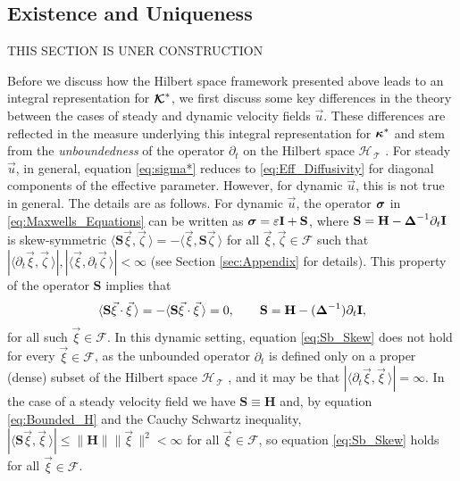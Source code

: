\documentclass[11pt]{amsart}
\newcommand{\Hb}{\mathbf{H}}
\newcommand{\Ib}{\mathbf{I}}
\newcommand{\Sb}{\mathbf{S}}
\newcommand\Kbc{\mbox{\boldmath${\mathcal{K}}$}}
\newcommand{\Tc}{\mathcal{T}}
\newcommand{\Hs}{\mathscr{H}}
\newcommand{\Fs}{\mathscr{F}}
\newcommand\bsig{\mbox{\boldmath${\sigma}$}}
\newcommand\bDelta{\mbox{\boldmath${\Delta}$}}
\newcommand\bkappa{\mbox{\boldmath${\kappa}$}}
\begin{document}
\subsection{Existence and Uniqueness}\label{sec:Existance!}
%
THIS SECTION IS UNER CONSTRUCTION

Before we discuss how the Hilbert space framework presented above
leads to an  integral representation for $\Kbc^*$, we first discuss
some key differences in the theory between the cases of steady 
and dynamic velocity fields $\vec{u}$. These differences are reflected
in the measure underlying this integral representation for $\bkappa^*$
and stem from the \emph{unboundedness} of the operator $\partial_t$ on the
Hilbert space $\Hs_{\,\Tc}$ \cite{Reed-1980,Stone:64}. For steady
$\vec{u}$, in general, equation \eqref{eq:sigma*} reduces to
\eqref{eq:Eff_Diffusivity} for  diagonal components of the effective
parameter.  However, for dynamic $\vec{u}$, this is not true in
general. The details are as follows. For dynamic $\vec{u}$, the
operator $\bsig$ in \eqref{eq:Maxwells_Equations} can be written as
$\bsig=\varepsilon\Ib+\Sb$, where  $\Sb=\Hb-\bDelta^{-1}\partial_t\Ib$ is skew-symmetric 
$\langle\Sb\vec{\xi},\vec{\zeta}\,\rangle=-\langle\vec{\xi},\Sb\vec{\zeta}\,\rangle$ for all
$\vec{\xi},\vec{\zeta}\in\Fs$ such that
$|\langle\partial_t\vec{\xi},\vec{\zeta}\,\rangle|,|\langle\vec{\xi},\partial_t\vec{\zeta}\,\rangle|<\infty$ (see Section
\ref{sec:Appendix} for details).  
This property of the operator $\Sb$ implies that
%
\begin{align}\label{eq:Sb_Skew_2}
  \langle\Sb\vec{\xi}\cdot\vec{\xi}\,\rangle=-\langle\Sb\vec{\xi}\cdot\vec{\xi}\,\rangle=0,
  \qquad
  \Sb=\Hb-(\bDelta^{-1})\partial_t\Ib,
\end{align}
%
for all such $\vec{\xi}\in\Fs$. In this dynamic setting, equation
\eqref{eq:Sb_Skew} does not hold for every $\vec{\xi}\in\Fs$, as the
unbounded operator $\partial_t$ is defined only on a proper (dense) subset of
the Hilbert space $\Hs_{\,\Tc}$ \cite{Reed-1980}, and it may be that
$|\langle\partial_t\vec{\xi},\vec{\xi}\,\rangle|=\infty$. In the case of a steady velocity field
we have $\Sb\equiv\Hb$ and, by equation \eqref{eq:Bounded_H} and the Cauchy
Schwartz inequality, $|\langle\Sb\vec{\xi},\vec{\xi}\,\rangle|\leq\|\Hb\|\|\vec{\xi}\,\|^2<\infty$ for
all $\vec{\xi}\in\Fs$, so equation \eqref{eq:Sb_Skew} holds for all
$\vec{\xi}\in\Fs$.   
\end{document}
